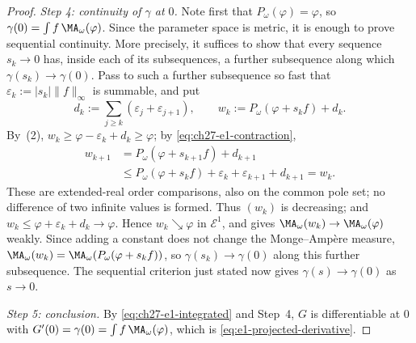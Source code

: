 \begin{proof}
\emph{Step 4: continuity of $\gamma$ at $0$.}
Note first that $P_\omega(\varphi)=\varphi$, so
$\gamma(0)=\int f\,\MA_\omega(\varphi)$.  Since the parameter space is
metric, it is enough to prove sequential continuity.  More precisely, it
suffices to show that every sequence $s_k\to0$ has, inside each of its
subsequences, a further subsequence along which
$\gamma(s_k)\to\gamma(0)$.  Pass to such a further subsequence so fast that
$\varepsilon_k:=|s_k|\lVert f\rVert_\infty$ is summable, and put
\[
 d_k:=\sum_{j\geq k}(\varepsilon_j+\varepsilon_{j+1}),
 \qquad
 w_k:=P_\omega(\varphi+s_kf)+d_k .
\]
By \,(2), $w_k\geq
\varphi-\varepsilon_k+d_k\geq\varphi$; by
\eqref{eq:ch27-e1-contraction},
\[
 \begin{aligned}
 w_{k+1}
 &=P_\omega(\varphi+s_{k+1}f)+d_{k+1}\\
 &\leq P_\omega(\varphi+s_kf)
       +\varepsilon_k+\varepsilon_{k+1}+d_{k+1}
 =w_k .
 \end{aligned}
\]
These are extended-real order comparisons, also on the common pole set;
no difference of two infinite values is formed.  Thus $(w_k)$ is decreasing; and $w_k\leq\varphi+\varepsilon_k+d_k\to
\varphi$.  Hence $w_k\searrow\varphi$ in $\mathcal E^1$, and
 gives
$\MA_\omega(w_k)\to\MA_\omega(\varphi)$ weakly.  Since adding a constant
does not change the Monge--Amp\`ere measure,
$\MA_\omega(w_k)=\MA_\omega(P_\omega(\varphi+s_kf))$, so
$\gamma(s_k)\to\gamma(0)$ along this further subsequence.  The sequential
criterion just stated now gives $\gamma(s)\to\gamma(0)$ as $s\to0$.

\emph{Step 5: conclusion.}
By \eqref{eq:ch27-e1-integrated} and Step~4, $G$ is differentiable at
$0$ with $G'(0)=\gamma(0)=\int f\,\MA_\omega(\varphi)$, which is
\eqref{eq:e1-projected-derivative}.
\end{proof}

\begin{center}
\end{center}


